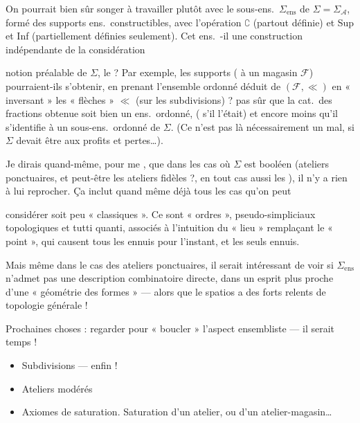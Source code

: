 \documentclass[11pt,a4paper]{article}
\begin{document}
On pourrait bien sûr songer à travailler plutôt avec le sous-ens.\ $\Sigma_{\mathrm{ens}}$ de $\Sigma = \Sigma_{\mathcal{A}}$, formé des supports ens.\ constructibles, avec l'opération $\complement$ (partout définie) et Sup et Inf (partiellement définies seulement). Cet ens.\ -il une construction indépendante de la considération

notion préalable de $\Sigma$, le  ? Par exemple, les supports   (\struck{\ill{}}  à un magasin  $\mathcal{F}$) pourraient-ils s'obtenir, en prenant l'ensemble ordonné déduit de $(\mathcal{F}, \ll)$ en « inversant » les « flèches » $\ll$ (sur les subdivisions) ?  pas \ill{} sûr que la cat.\ des fractions obtenue soit bien un ens.\ ordonné, ( s'il l'était) et encore moins qu'il \struck{\ill{} \ill{}} s'identifie à un sous-ens.\ ordonné de $\Sigma$. (Ce n'est pas là nécessairement un mal, si $\Sigma$ devait être  aux profits et pertes…).

Je dirais quand-même, pour me , que dans les cas où $\Sigma$ est booléen (ateliers ponctuaires, et peut-être  les ateliers fidèles ?, en tout cas \ill{} aussi les ), il n'y a rien à lui reprocher. Ça inclut quand même déjà tous les cas qu'on peut

considérer  soit peu « classiques ». Ce sont  « ordres », pseudo-simpliciaux topologiques et tutti quanti, associés à l'intuition du « lieu » remplaçant le « point », qui causent tous les ennuis pour l'instant, et les seuls ennuis.

Mais même dans le cas des ateliers ponctuaires, il serait intéressant de voir si $\Sigma_{\mathrm{ens}}$ n'admet pas une description combinatoire directe, dans un esprit plus proche d'une « géométrie des formes » — alors que le spatios a des forts relents de topologie générale !

Prochaines choses : regarder pour « boucler » l'aspect  ensembliste — il serait temps !
\begin{itemize}
  \item[a)] Subdivisions — enfin ! 
  \item[b)] Ateliers modérés
  \item[c)] Axiomes de saturation. Saturation d'un atelier, ou d'un atelier-magasin…
\end{itemize}
\end{document}
